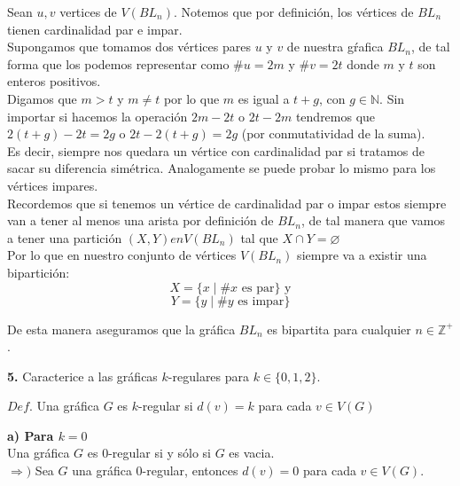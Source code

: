 \documentclass[12pt]{article}
\begin{document}
Sean $u,v$ vertices de $V(BL_n)$. Notemos que por definición, los vértices de $BL_n$  tienen cardinalidad par e impar.\\

Supongamos que tomamos dos vértices pares $u$ y $v$ de nuestra gŕafica $BL_n$, de tal forma que los podemos representar
como $\# u  = 2m$ y $\# v = 2t$ donde $m$ y $t$ son enteros positivos.\\

Digamos que $m > t$ y $m \neq t$ por lo que $m$ es igual a $t + g$, con $g \in \mathbb{N}$. Sin 
importar si hacemos la operación $2 m - 2t$ o $2t - 2m$ tendremos que $2 (t + g) - 2t = 2g$ o $2t - 2(t + g) = 2g$ (por conmutatividad de la suma).\\

Es decir, siempre nos quedara un vértice con cardinalidad par si tratamos de sacar su diferencia simétrica. Analogamente se puede probar lo mismo para los vértices impares.\\

Recordemos que si tenemos un vértice de cardinalidad par o impar estos siempre van a tener al menos una arista por definición de $BL_n$, de 
tal manera que vamos a tener una partición $(X, Y) en V(BL_n)$ tal que $X \cap Y = \varnothing$ \\

Por lo que en nuestro conjunto de vértices $V(BL_n)$ siempre va a existir una bipartición:
\[X = \{ x \mid \# x \text{ es par}\} \text{ y}\]
\[Y = \{ y \mid \# y \text{ es impar}\}\]

De esta manera aseguramos que la gráfica $BL_n$ es bipartita para cualquier $n \in \mathbb{Z^+}$.
\vspace{1cm}

%
%
\textbf{5.} Caracterice a las gráficas $k$-regulares para $k \in \{0, 1, 2\}$.

\begin{tcolorbox}[title=\textbf{Definiciones}, colback=blue!15!white, colframe=black!]
    $Def$. Una gráfica $G$ es $k$-regular si $d(v) = k$ para cada $v \in V(G)$
\end{tcolorbox}

\textbf{a) Para $k = 0$}\\

Una gráfica $G$ es $0$-regular si y sólo si $G$ es vacia.\\

$\Longrightarrow)$ Sea $G$ una gráfica $0$-regular, entonces $d(v) = 0$ para cada $v \in V(G)$.\\
\end{document}
